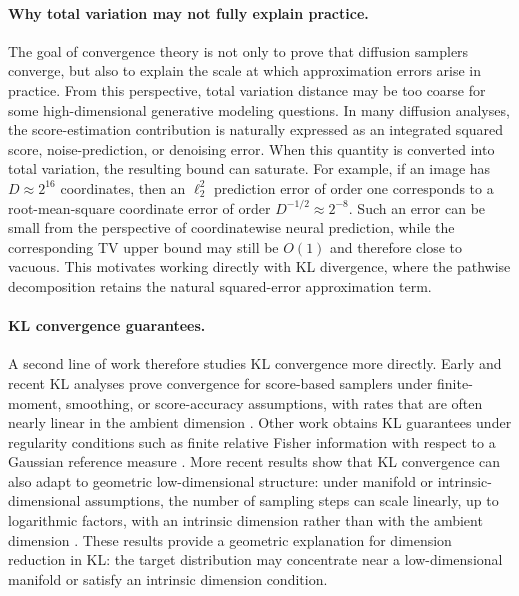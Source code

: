 \documentclass[11pt]{article}
\begin{document}
\paragraph{Why total variation may not fully explain practice.}
The goal of convergence theory is not only to prove that diffusion samplers
converge, but also to explain the scale at which approximation errors arise in
practice. From this perspective, total variation distance may be too coarse
for some high-dimensional generative modeling questions. In many diffusion
analyses, the score-estimation contribution is naturally expressed as an
integrated squared score, noise-prediction, or denoising error. When this
quantity is converted into total variation, the resulting bound can saturate.
For example, if an image has $D\approx 2^{16}$ coordinates, then an
$\ell_2^2$ prediction error of order one corresponds to a root-mean-square
coordinate error of order $D^{-1/2}\approx 2^{-8}$. Such an error can be small
from the perspective of coordinatewise neural prediction, while the
corresponding TV upper bound may still be $O(1)$ and therefore close to
vacuous. This motivates working directly with KL divergence, where the
pathwise decomposition retains the natural squared-error approximation term.

\paragraph{KL convergence guarantees.}
A second line of work therefore studies KL convergence more directly. Early
and recent KL analyses prove convergence for score-based samplers under
finite-moment, smoothing, or score-accuracy assumptions, with rates that are
often nearly linear in the ambient dimension
\cite{chen2023improved,benton2024nearly}. Other work obtains KL guarantees
under regularity conditions such as finite relative Fisher information with
respect to a Gaussian reference measure \cite{conforti2025kl}. More recent
results show that KL convergence can also adapt to geometric low-dimensional
structure: under manifold or intrinsic-dimensional assumptions, the number of
sampling steps can scale linearly, up to logarithmic factors, with an
intrinsic dimension rather than with the ambient dimension
\cite{pmlr-v291-potaptchik25a,huang2026denoising}. These results provide a
geometric explanation for dimension reduction in KL: the target distribution
may concentrate near a low-dimensional manifold or satisfy an intrinsic
dimension condition.
\end{document}
